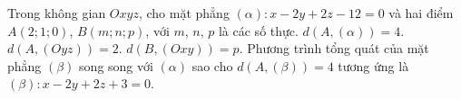 \begin{ex}
Trong không gian $Oxyz$, cho mặt phẳng $(\alpha)\colon x-2y+2z-12=0$ và hai điểm $A(2;1;0)$, $B(m;n;p)$, với $m$, $n$, $p$ là các số thực.
\choiceTF
{\True $d\left(A,(\alpha)\right)=4$.}
{\True $d\left(A,(Oyz)\right)=2$.}
{$d\left(B,(Oxy)\right)=p$.}
{Phương trình tổng quát của mặt phẳng $(\beta)$ song song với $(\alpha)$ sao cho $d\left(A,(\beta)\right)=4$ tương ứng là $(\beta)\colon x-2y+2z+3=0$.}
\end{ex}
